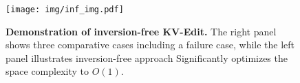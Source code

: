 \begin{figure}[t]
    \centering
    \texttt{[image: img/inf\_img.pdf]}
    \caption{\textbf{Demonstration of inversion-free KV-Edit.} The right panel shows three comparative cases including a failure case, while the left panel illustrates inversion-free approach Significantly optimizes the space complexity to $O(1)$.}
    \label{fig:inf}
    \vspace{-10pt}
\end{figure}
